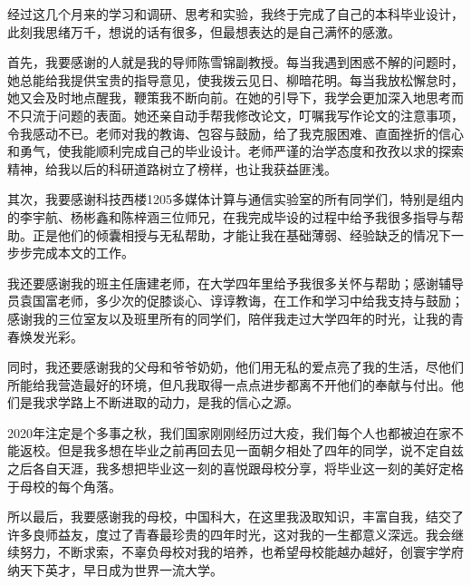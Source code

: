 
\begin{acknowledgements}

经过这几个月来的学习和调研、思考和实验，我终于完成了自己的本科毕业设计，此刻我思绪万千，想说的话有很多，但最想表达的是自己满怀的感激。

首先，我要感谢的人就是我的导师陈雪锦副教授。每当我遇到困惑不解的问题时，她总能给我提供宝贵的指导意见，使我拨云见日、柳暗花明。每当我放松懈怠时，她又会及时地点醒我，鞭策我不断向前。在她的引导下，我学会更加深入地思考而不只流于问题的表面。她还亲自动手帮我修改论文，叮嘱我写作论文的注意事项，令我感动不已。老师对我的教诲、包容与鼓励，给了我克服困难、直面挫折的信心和勇气，使我能顺利完成自己的毕业设计。老师严谨的治学态度和孜孜以求的探索精神，给我以后的科研道路树立了榜样，也让我获益匪浅。

其次，我要感谢科技西楼1205多媒体计算与通信实验室的所有同学们，特别是组内的李宇航、杨彬鑫和陈梓涵三位师兄，在我完成毕设的过程中给予我很多指导与帮助。正是他们的倾囊相授与无私帮助，才能让我在基础薄弱、经验缺乏的情况下一步步完成本文的工作。

我还要感谢我的班主任唐建老师，在大学四年里给予我很多关怀与帮助；感谢辅导员袁国富老师，多少次的促膝谈心、谆谆教诲，在工作和学习中给我支持与鼓励；感谢我的三位室友以及班里所有的同学们，陪伴我走过大学四年的时光，让我的青春焕发光彩。

同时，我还要感谢我的父母和爷爷奶奶，他们用无私的爱点亮了我的生活，尽他们所能给我营造最好的环境，但凡我取得一点点进步都离不开他们的奉献与付出。他们是我求学路上不断进取的动力，是我的信心之源。

2020年注定是个多事之秋，我们国家刚刚经历过大疫，我们每个人也都被迫在家不能返校。但是我多想在毕业之前再回去见一面朝夕相处了四年的同学，说不定自兹之后各自天涯，我多想把毕业这一刻的喜悦跟母校分享，将毕业这一刻的美好定格于母校的每个角落。

所以最后，我要感谢我的母校，中国科大，在这里我汲取知识，丰富自我，结交了许多良师益友，度过了青春最珍贵的四年时光，这对我的一生都意义深远。我会继续努力，不断求索，不辜负母校对我的培养，也希望母校能越办越好，创寰宇学府纳天下英才，早日成为世界一流大学。

\end{acknowledgements}
